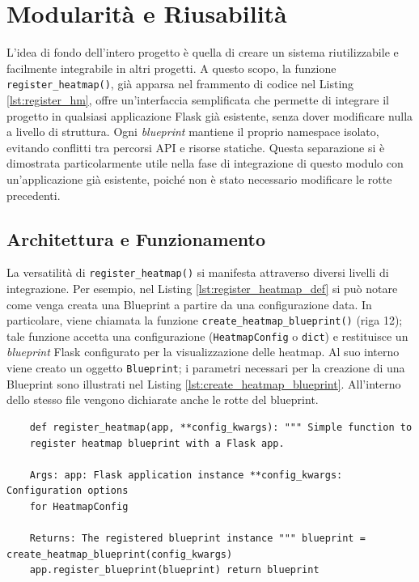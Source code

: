 \section{Modularità e Riusabilità}

L'idea di fondo dell'intero progetto è quella di creare un sistema riutilizzabile
e facilmente integrabile in altri progetti. A questo scopo, la funzione \texttt{register\_heatmap()},
già apparsa nel frammento di codice nel Listing \ref{lst:register_hm}, offre un'interfaccia
semplificata che permette di integrare il progetto in qualsiasi applicazione
Flask già esistente, senza dover modificare nulla a livello di struttura. Ogni
\textit{blueprint} mantiene il proprio namespace isolato, evitando conflitti tra
percorsi API e risorse statiche. Questa separazione si è dimostrata particolarmente
utile nella fase di integrazione di questo modulo con un'applicazione già esistente,
poiché non è stato necessario modificare le rotte precedenti.

\subsection{Architettura e Funzionamento}

La versatilità di \texttt{register\_heatmap()} si manifesta attraverso diversi
livelli di integrazione. Per esempio, nel Listing \ref{lst:register_heatmap_def}
si può notare come venga creata una Blueprint a partire da una configurazione
data. In particolare, viene chiamata la funzione \texttt{create\_heatmap\_blueprint()}
(riga 12); tale funzione accetta una configurazione (\texttt{HeatmapConfig} o
\texttt{dict}) e restituisce un \textit{blueprint} Flask configurato per la visualizzazione
delle heatmap. Al suo interno viene creato un oggetto \texttt{Blueprint}; i
parametri necessari per la creazione di una Blueprint sono illustrati nel
Listing \ref{lst:create_heatmap_blueprint}. All'interno dello stesso file vengono
dichiarate anche le rotte del blueprint.

\begin{listing}
  [h]
  \caption{Definizione della funzione \texttt{register\_heatmap()}}
  \label{lst:register_heatmap_def}
  \begin{verbatim}
    def register_heatmap(app, **config_kwargs): """ Simple function to
    register heatmap blueprint with a Flask app.

    Args: app: Flask application instance **config_kwargs: Configuration options
    for HeatmapConfig

    Returns: The registered blueprint instance """ blueprint = create_heatmap_blueprint(config_kwargs)
    app.register_blueprint(blueprint) return blueprint
  \end{verbatim}
\end{listing}

